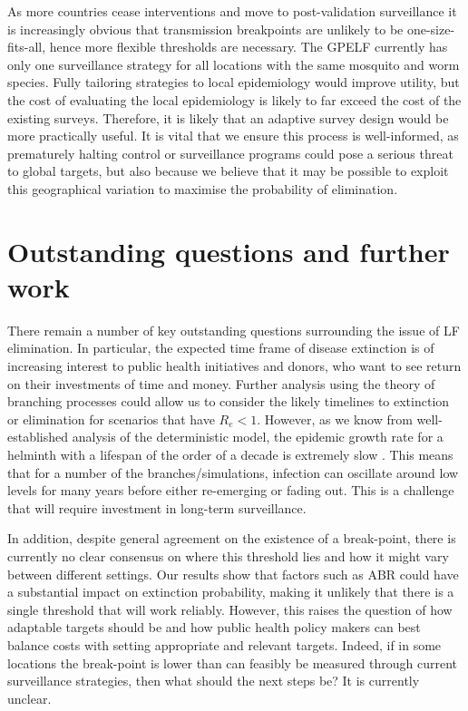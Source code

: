 As more countries cease interventions and move to post-validation surveillance it is increasingly obvious that transmission breakpoints are unlikely to be one-size-fits-all, hence more flexible thresholds are necessary. The GPELF currently has only one surveillance strategy for all locations with the same mosquito and worm species. Fully tailoring strategies to local epidemiology would improve utility, but the cost of evaluating the local epidemiology is likely to far exceed the cost of the existing surveys. Therefore, it is likely that an adaptive survey design would be more practically useful. It is vital that we ensure this process is well-informed, as prematurely halting control or surveillance programs could pose a serious threat to global targets, but also because we believe that it may be possible to exploit this geographical variation to maximise the probability of elimination.


\section[Outstanding questions]{Outstanding questions and further work}

There remain a number of key outstanding questions surrounding the issue of LF elimination. In particular, the expected time frame of disease extinction is of increasing interest to public health initiatives and donors, who want to see return on their investments of time and money. Further analysis using the theory of branching processes could allow us to consider the likely timelines to extinction or elimination for scenarios that have $R_e<1$. However, as we know from well-established analysis of the deterministic model, the epidemic growth rate for a helminth with a lifespan of the order of a decade is extremely slow \cite{Anderson1992}. This means that for a number of the branches/simulations, infection can oscillate around low levels for many years before either re-emerging or fading out. This is a challenge that will require investment in long-term surveillance.

In addition, despite general agreement on the existence of a break-point, there is currently no clear consensus on where this threshold lies and how it might vary between different settings. Our results show that factors such as ABR could have a substantial impact on extinction probability, making it unlikely that there is a single threshold that will work reliably. However, this raises the question of how adaptable targets should be and how public health policy makers can best balance costs with setting appropriate and relevant targets. Indeed, if in some locations the break-point is lower than can feasibly be measured through current surveillance strategies, then what should the next steps be? It is currently unclear.

